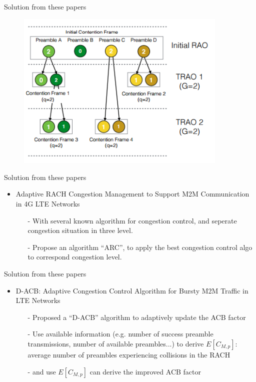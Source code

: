 \documentclass{beamer}
\begin{document}
\begin{frame}{Solution from these papers}
    \begin{figure}[t]
        \centering
        \includegraphics[width=0.9\textwidth]{figures/TRAO.png}
    \end{figure}
\end{frame}

\begin{frame}{Solution from these papers}
    \begin{itemize}
        \item {Adaptive RACH Congestion Management to Support M2M Communication in 4G LTE Networks}
        \begin{itemize}
            \item [-]{With several known algorithm for congestion control, and seperate congestion situation in three level.}
            \item [-]{Propose an algorithm ``ARC'', to apply the best congestion control algo to correspond congestion level.}
        \end{itemize}
    \end{itemize}
\end{frame}

\begin{frame}{Solution from these papers}
    \begin{itemize}
        \item {D-ACB: Adaptive Congestion Control Algorithm for Bursty M2M Traffic in LTE Networks}
        \begin{itemize}
            \item [-]{Proposed a ``D-ACB'' algorithm to adaptively update the ACB factor}
            \item [-]{Use available information (e.g. number of success preamble transmissions, number of available preambles...) to derive ${E[C_{M,p}]}$: average number of preambles experiencing collisions in the RACH}
            \item [-]{and use ${E[C_{M,p}]}$ can derive the improved ACB factor}
        \end{itemize}
    \end{itemize}
\end{frame}
\end{document}
